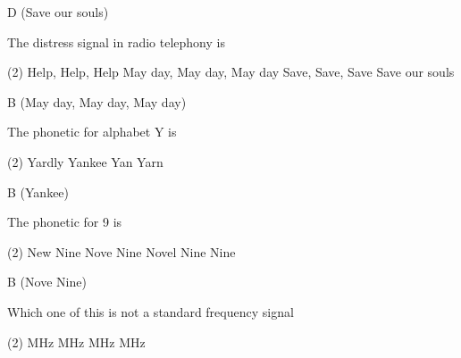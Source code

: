 \documentclass[a4paper]{article}
\begin{document}
\begin{solution}
	D (Save our souls)
\end{solution}

\vspace{5mm}



\begin{question}The distress signal in radio telephony is
	\begin{tasks}(2)
		\task Help, Help, Help
		\task May day, May day, May day
		\task Save, Save, Save
		\task Save our souls
	\end{tasks}
\end{question}

\begin{solution}
	B (May day, May day, May day)
\end{solution}

\vspace{5mm}



\begin{question}The phonetic for alphabet \apostrophe{}Y\apostrophe{} is
	\begin{tasks}(2)
		\task Yardly
		\task Yankee
		\task Yan
		\task Yarn
	\end{tasks}
\end{question}

\begin{solution}
	B (Yankee)
\end{solution}

\vspace{5mm}



\begin{question}The phonetic for \apostrophe{}9\apostrophe{} is
	\begin{tasks}(2)
		\task New Nine
		\task Nove Nine
		\task Novel Nine
		\task Nine
	\end{tasks}
\end{question}

\begin{solution}
	B (Nove Nine)
\end{solution}

\vspace{5mm}



\begin{question}Which one of this is not a standard frequency signal
	\begin{tasks}(2)
		 MHz
		 MHz
		 MHz
		 MHz
	\end{tasks}
\end{question}
\end{document}
